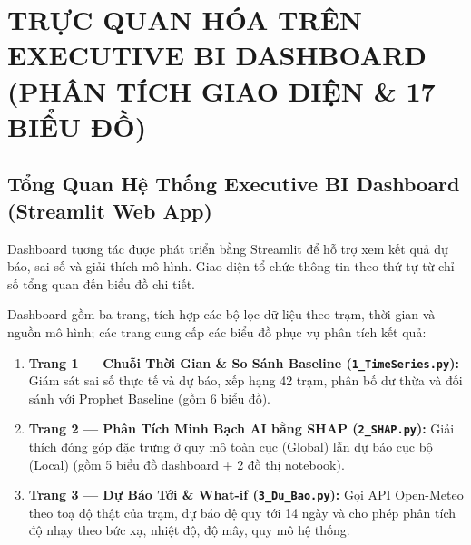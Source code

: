 \documentclass[12pt,a4paper]{article}
\begin{document}
\begin{center}
\end{center}

\fi

\section[EXECUTIVE BI DASHBOARD]{TRỰC QUAN HÓA TRÊN\\EXECUTIVE BI DASHBOARD\\(PHÂN TÍCH GIAO DIỆN \& 17 BIỂU ĐỒ)}

\subsection[Tổng Quan Executive BI Dashboard]{Tổng Quan Hệ Thống Executive BI Dashboard\\(Streamlit Web App)}
Dashboard tương tác được phát triển bằng Streamlit để hỗ trợ xem kết quả dự báo, sai số và giải thích mô hình. Giao diện tổ chức thông tin theo thứ tự từ chỉ số tổng quan đến biểu đồ chi tiết.

Dashboard gồm ba trang, tích hợp các bộ lọc dữ liệu theo trạm, thời gian và nguồn mô hình; các trang cung cấp các biểu đồ phục vụ phân tích kết quả:
\begin{enumerate}
    \item \textbf{Trang 1 — Chuỗi Thời Gian \& So Sánh Baseline (\texttt{1\_TimeSeries.py}):} Giám sát sai số thực tế và dự báo, xếp hạng 42 trạm, phân bố dư thừa và đối sánh với Prophet Baseline (gồm 6 biểu đồ).
    \item \textbf{Trang 2 — Phân Tích Minh Bạch AI bằng SHAP (\texttt{2\_SHAP.py}):} Giải thích đóng góp đặc trưng ở quy mô toàn cục (Global) lẫn dự báo cục bộ (Local) (gồm 5 biểu đồ dashboard + 2 đồ thị notebook).
    \item \textbf{Trang 3 — Dự Báo Tới \& What-if (\texttt{3\_Du\_Bao.py}):} Gọi API Open-Meteo theo toạ độ thật của trạm, dự báo đệ quy tới 14 ngày và cho phép phân tích độ nhạy theo bức xạ, nhiệt độ, độ mây, quy mô hệ thống.
\end{enumerate}
\end{document}
